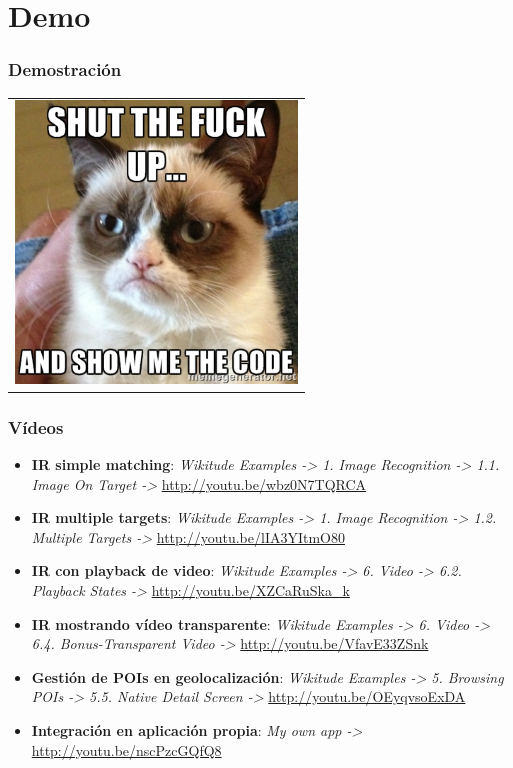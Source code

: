 \section{Demo}
\frame
{
\frametitle{Demostración}
{
\begin{table}[ht]
  \centering
  \begin{tabular}{c}
    \includegraphics[height=7.5cm]{imgs/demo.jpg}
  \end{tabular}
\end{table}
}
}

\frame
{
\frametitle{Vídeos}
{
\begin{itemize}
  \item \textbf{IR simple matching}: \textit{Wikitude Examples -> 1. Image Recognition -> 1.1. Image On Target ->} \url{http://youtu.be/wbz0N7TQRCA}
  \item \textbf{IR multiple targets}: \textit{Wikitude Examples -> 1. Image Recognition -> 1.2. Multiple Targets ->} \url{http://youtu.be/lIA3YItmO80}
  \item \textbf{IR con playback de video}: \textit{Wikitude Examples -> 6. Video -> 6.2. Playback States ->} \url{http://youtu.be/XZCaRuSka_k}
  \item \textbf{IR mostrando vídeo transparente}: \textit{Wikitude Examples -> 6. Video -> 6.4. Bonus-Transparent Video ->} \url{http://youtu.be/VfavE33ZSnk}
  \item \textbf{Gestión de POIs en geolocalización}: \textit{Wikitude Examples -> 5. Browsing POIs -> 5.5. Native Detail Screen ->} \url{http://youtu.be/OEyqvsoExDA}
  \item \textbf{Integración en aplicación propia}: \textit{My own app ->} \url{http://youtu.be/nscPzcGQfQ8}
\end{itemize}
}
}

